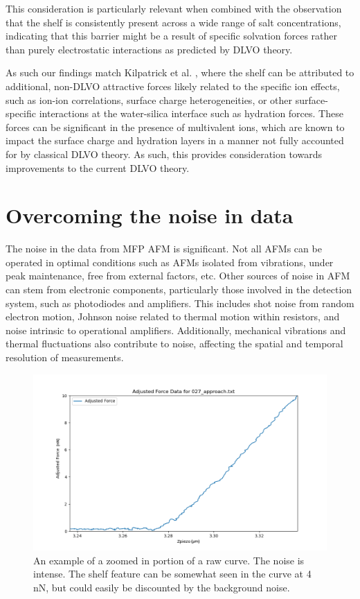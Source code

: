 This consideration is particularly relevant when combined with the observation that the shelf is consistently present across a wide range of salt concentrations, indicating that this barrier might be a result of specific solvation forces rather than purely electrostatic interactions as predicted by DLVO theory. 

As such our findings match Kilpatrick et al. \cite{Kilpatrick2013DirectlyProbing}, where the shelf can be attributed to additional, non-DLVO attractive forces likely related to the specific ion effects, such as ion-ion correlations, surface charge heterogeneities, or other surface-specific interactions at the water-silica interface such as hydration forces. These forces can be significant in the presence of multivalent ions, which are known to impact the surface charge and hydration layers in a manner not fully accounted for by classical DLVO theory. As such, this provides consideration towards improvements to the current DLVO theory.

\section{Overcoming the noise in data}

The noise in the data from MFP AFM is significant. Not all AFMs can be operated in optimal conditions such as AFMs isolated from vibrations, under peak maintenance, free from external factors, etc. Other sources of noise in AFM can stem from electronic components, particularly those involved in the detection system, such as photodiodes and amplifiers. This includes shot noise from random electron motion, Johnson noise related to thermal motion within resistors, and noise intrinsic to operational amplifiers. Additionally, mechanical vibrations and thermal fluctuations also contribute to noise, affecting the spatial and temporal resolution of measurements. \cite{gittes1997signals}

\begin{figure}[h!]
\centering
\includegraphics[width=\textwidth]{chapter8/Shelf/027_approach_zoom.png}
\caption{An example of a zoomed in portion of a raw curve. The noise is intense. The shelf feature can be somewhat seen in the curve at 4 nN, but could easily be discounted by the background noise.}
\label{fig:noisey2}
\end{figure}

